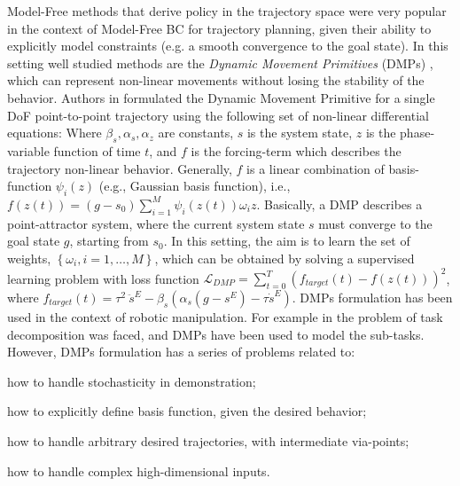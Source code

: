 Model-Free methods that derive policy in the trajectory space were very popular in the context of Model-Free BC for trajectory planning, given their ability to explicitly model constraints (e.g. a smooth convergence to the goal state). In this setting well studied methods are the \textit{Dynamic Movement Primitives} (DMPs) \cite{ijspeert2002learning,ijspeert2013dynamical}, which can represent non-linear movements without losing the stability of the behavior.  
Authors in \cite{ijspeert2013dynamical} formulated the Dynamic Movement Primitive for a single DoF point-to-point trajectory using the following set of non-linear differential equations:  Where $\beta_{s}, \alpha_{s}, \alpha_{z}$ are constants, $s$ is the system state, $z$ is the phase-variable function of time $t$, and $f$ is the forcing-term which describes the trajectory non-linear behavior. Generally, $f$ is a linear combination of basis-function $\psi_{i}(z)$ (e.g., Gaussian basis function), i.e., $f(z(t)) = (g-s_{0}) \sum_{i=1}^{M}\psi_{i}(z(t))\omega_{i}z$. Basically, a DMP describes a point-attractor system, where the current system state $s$ must converge to the goal state $g$, starting from $s_{0}$. In this setting, the aim is to learn the set of weights, $\left\{\omega_{i}, i=1,\dots,M\right\}$, which can be obtained by solving a supervised learning problem with loss function $\mathcal{L}_{DMP} = \sum_{t=0}^{T}(f_{target}(t) - f(z(t)))^{2}$, where $f_{target}(t) = \tau^{2} \ \ddot{s}^{E} - \beta_{s}(\alpha_{s}(g - s^{E})-\tau \dot{s}^{E})$. DMPs formulation has been used in the context of robotic manipulation. For example in \cite{meier2011movement_primitive,caccavale2019kinesthetic,agostini2020manipulation} the problem of task decomposition was faced, and DMPs have been used to model the sub-tasks. However, DMPs formulation has a series of problems related to: \begin{enumerate*}[label=(\textbf{\alph*})]
    \item how to handle stochasticity in demonstration;
    \item how to explicitly define basis function, given the desired behavior;
    \item how to handle arbitrary desired trajectories, with intermediate via-points;
    \item how to handle complex high-dimensional inputs. 
\end{enumerate*}
